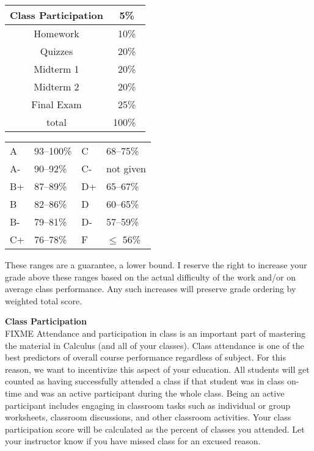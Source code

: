 \documentclass[12pt]{article}
\renewcommand{\emph}[1]{\textsf{\textbf{#1}}}
\newcommand{\localhead}[1]{\par\smallskip\textbf{#1} \smallskip\nobreak\\}%
\def\heading#1{\localhead{\large\emph{#1}}}
\begin{document}
\begin{multicols}{2}
\begin{tabular}{|c|c|}
\hline
Class Participation & 5\%\\
\hline
Homework & 10\% \\
\hline
Quizzes & 20\% \\
\hline
Midterm 1 & 20\% \\
\hline
Midterm 2 & 20\%  \\
\hline
Final Exam & 25\% \\
\hline
total & 100\% \, \\
\hline
\end{tabular}


\begin{tabular}{llll}
A  & 93--100\%& C  & 68--75\%  \\
A- & 90--92\% & C- & not given \\
B+ & 87--89\% & D+ & 65--67\%  \\
B  & 82--86\% & D  & 60--65\%  \\
B- & 79--81\% & D- & 57--59\%  \\
C+ & 76--78\% & F  & $\le$ 56\%
\end{tabular}
\end{multicols}

These ranges are a guarantee, a lower bound. I reserve the right to increase your grade above these ranges based on the actual difficulty of the work and/or on average class performance. Any such increases will preserve grade ordering by weighted total score. 

\heading{Class Participation}
FIXME Attendance and participation in class is an important part of mastering the material in Calculus (and all of your classes).  Class attendance is one of the best predictors of overall course performance regardless of subject.  For this reason, we want to incentivize this aspect of your education.  All students will get counted as having successfully attended a class if that student was in class on-time and was an active participant during the whole class.  Being an active participant includes engaging in classroom tasks such as individual or group worksheets, classroom discussions, and other classroom activities.  Your class participation score will be calculated as the percent of classes you attended.  Let your instructor know if you have missed class for an excused reason.
\end{document}
